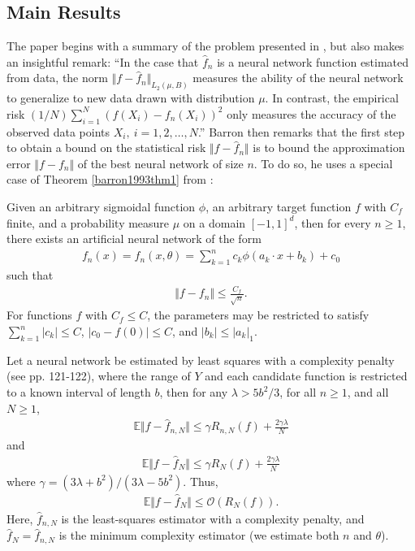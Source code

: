 \documentclass{article}
\newenvironment{manualtheorem}[1]{%
  \renewcommand\themanualtheoreminner{#1}%
  \manualtheoreminner
}{\endmanualtheoreminner}
\begin{document}
\subsection{Main Results}
The paper begins with a summary of the problem presented in \cite{barron1993universal}, but also makes an insightful remark: \enquote{In the case that $\hat{f}_n$ is a neural network function estimated from data, the norm $\Vert f - \hat{f}_n \Vert_{L_2(\mu, B)}$ measures the ability of the neural network to generalize to new data drawn with distribution $\mu$. In contrast, the empirical risk $(1/N) \sum_{i=1}^N (f(X_i) - f_n(X_i))^2$ only measures the accuracy of the observed data points $X_i, \ i = 1, 2, \ldots, N$.} 
Barron then remarks that the first step to obtain a bound on the statistical risk $\Vert f - \hat{f}_n \Vert$ is to bound the approximation error $\Vert f - f_n \Vert$ of the best neural network of size $n$. To do so, he uses a special case of Theorem \ref{barron1993thm1} from \cite{barron1993universal}:
\begin{manualtheorem}{1}
Given an arbitrary sigmoidal function $\phi$, an arbitrary target function $f$ with $C_f$ finite, and a probability measure $\mu$ on a domain $[-1, 1]^d$, then for every $n \geq 1$, there exists an artificial neural network of the form
\begin{align*}
    f_n(x) = f_n(x, \theta) = \sum_{k=1}^n c_k \phi(a_k \cdot x + b_k) + c_0
\end{align*}
such that 
\begin{align*}
    \Vert f - f_n \Vert \leq \frac{C_f}{\sqrt{n}}.
\end{align*}
For functions $f$ with $C_f \leq C$, the parameters may be restricted to satisfy $\sum_{k=1}^n \left| c_k \right| \leq C$, $\left|c_0 - f(0) \right| \leq C$, and $\left| b_k \right| \leq \left| a_k \right|_1$. 
\end{manualtheorem}

\begin{manualtheorem}{2}
Let a neural network be estimated by least squares with a complexity penalty (see pp. 121-122), where the range of $Y$ and each candidate function is restricted to a known interval of length $b$, then for any $\lambda > 5b^2/3$, for all $n \geq 1$, and all $N \geq 1$,
\begin{align*}
    \mathbb{E} \Vert f - \hat{f}_{n, N} \Vert \leq \gamma R_{n, N}(f) + \frac{2 \gamma \lambda}{N}
\end{align*}
and 
\begin{align*}
    \mathbb{E} \Vert f - \hat{f}_{N} \Vert \leq \gamma R_{N}(f) + \frac{2 \gamma \lambda}{N}
\end{align*}
where $\gamma = (3\lambda + b^2)/(3\lambda - 5b^2)$. Thus,
\begin{align*}
    \mathbb{E} \Vert f - \hat{f}_N \Vert \leq \mathcal{O}(R_N(f)).
\end{align*}
\end{manualtheorem}
Here, $\hat{f}_{n, N}$ is the least-squares estimator with a complexity penalty, and $\hat{f}_N = \hat{f}_{\hat{n}, N}$ is the minimum complexity estimator (we estimate both $n$ and $\theta$).
\end{document}

